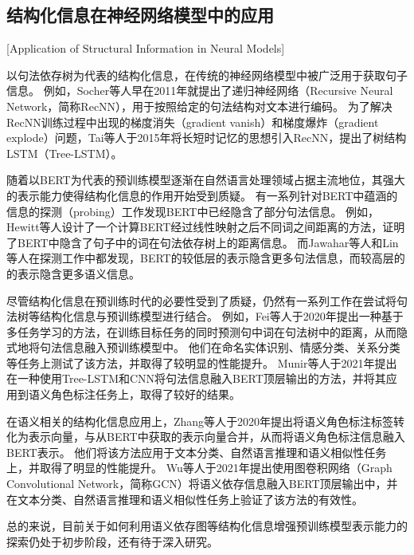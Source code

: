 \subsection{结构化信息在神经网络模型中的应用}[Application of Structural Information in Neural Models]

以句法依存树为代表的结构化信息，在传统的神经网络模型中被广泛用于获取句子信息。
例如，Socher等人早在2011年就提出了递归神经网络（Recursive Neural Network，简称RecNN）\cite{socher-etal-2011-parsing}，用于按照给定的句法结构对文本进行编码。
为了解决RecNN训练过程中出现的梯度消失（gradient vanish）和梯度爆炸（gradient explode）问题\cite{bengio-etal-1994-learning}，Tai等人于2015年将长短时记忆的思想引入RecNN，提出了树结构LSTM（Tree-LSTM）\cite{tai-etal-2015-improved}。

随着以BERT为代表的预训练模型逐渐在自然语言处理领域占据主流地位，其强大的表示能力使得结构化信息的作用开始受到质疑。
有一系列针对BERT中蕴涵的信息的探测（probing）工作发现BERT中已经隐含了部分句法信息。
例如，Hewitt等人\cite{hewitt-manning-2019-structural}设计了一个计算BERT经过线性映射之后不同词之间距离的方法，证明了BERT中隐含了句子中的词在句法依存树上的距离信息。
而Jawahar等人\cite{jawahar-etal-2019-bert}和Lin等人\cite{lin-etal-2019-open}在探测工作中都发现，BERT的较低层的表示隐含更多句法信息，而较高层的的表示隐含更多语义信息。

尽管结构化信息在预训练时代的必要性受到了质疑，仍然有一系列工作在尝试将句法树等结构化信息与预训练模型进行结合。
例如，Fei等人\cite{fei-etal-2020-retrofitting}于2020年提出一种基于多任务学习的方法，在训练目标任务的同时预测句中词在句法树中的距离，从而隐式地将句法信息融入预训练模型中。
他们在命名实体识别、情感分类、关系分类等任务上测试了该方法，并取得了较明显的性能提升。
Munir等人\cite{munir-etal-2021-adaptive}于2021年提出在一种使用Tree-LSTM和CNN将句法信息融入BERT顶层输出的方法，并将其应用到语义角色标注任务上，取得了较好的结果。

在语义相关的结构化信息应用上，Zhang等人\cite{zhang-etal-2020-semantics}于2020年提出将语义角色标注标签转化为表示向量，与从BERT中获取的表示向量合并，从而将语义角色标注信息融入BERT表示。
他们将该方法应用于文本分类、自然语言推理和语义相似性任务上，并取得了明显的性能提升。
Wu等人\cite{wu-etal-2021-infusing}于2021年提出使用图卷积网络（Graph Convolutional Network，简称GCN）将语义依存信息融入BERT顶层输出中，并在文本分类、自然语言推理和语义相似性任务上验证了该方法的有效性。

总的来说，目前关于如何利用语义依存图等结构化信息增强预训练模型表示能力的探索仍处于初步阶段，还有待于深入研究。

